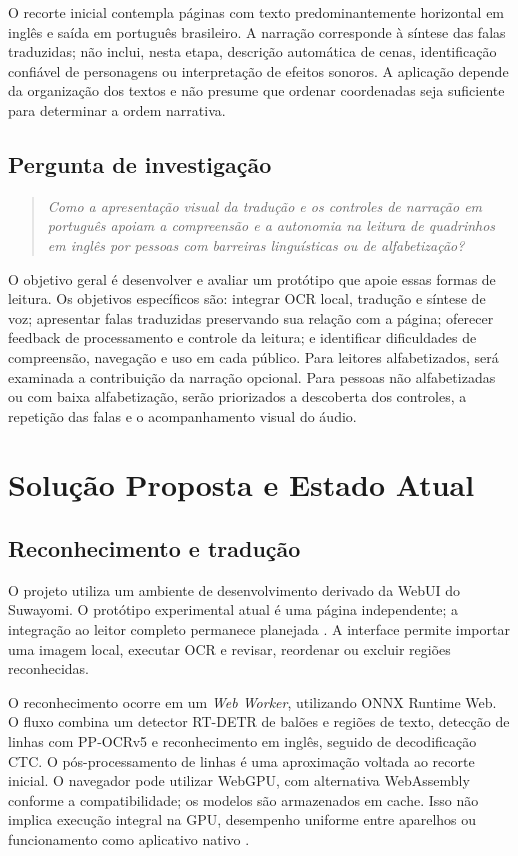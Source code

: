 \documentclass[conference]{IEEEtran}
\begin{document}
O recorte inicial contempla páginas com texto predominantemente horizontal em inglês e saída em português brasileiro. A narração corresponde à síntese das falas traduzidas; não inclui, nesta etapa, descrição automática de cenas, identificação confiável de personagens ou interpretação de efeitos sonoros. A aplicação depende da organização dos textos e não presume que ordenar coordenadas seja suficiente para determinar a ordem narrativa.

\subsection{Pergunta de investigação}
\begin{quote}
\emph{Como a apresentação visual da tradução e os controles de narração em português apoiam a compreensão e a autonomia na leitura de quadrinhos em inglês por pessoas com barreiras linguísticas ou de alfabetização?}
\end{quote}

O objetivo geral é desenvolver e avaliar um protótipo que apoie essas formas de leitura. Os objetivos específicos são: integrar OCR local, tradução e síntese de voz; apresentar falas traduzidas preservando sua relação com a página; oferecer feedback de processamento e controle da leitura; e identificar dificuldades de compreensão, navegação e uso em cada público. Para leitores alfabetizados, será examinada a contribuição da narração opcional. Para pessoas não alfabetizadas ou com baixa alfabetização, serão priorizados a descoberta dos controles, a repetição das falas e o acompanhamento visual do áudio.

\section{Solução Proposta e Estado Atual}
\subsection{Reconhecimento e tradução}
O projeto utiliza um ambiente de desenvolvimento derivado da WebUI do Suwayomi. O protótipo experimental atual é uma página independente; a integração ao leitor completo permanece planejada \cite{suwayomi}. A interface permite importar uma imagem local, executar OCR e revisar, reordenar ou excluir regiões reconhecidas.

O reconhecimento ocorre em um \emph{Web Worker}, utilizando ONNX Runtime Web. O fluxo combina um detector RT-DETR de balões e regiões de texto, detecção de linhas com PP-OCRv5 e reconhecimento em inglês, seguido de decodificação CTC. O pós-processamento de linhas é uma aproximação voltada ao recorte inicial. O navegador pode utilizar WebGPU, com alternativa WebAssembly conforme a compatibilidade; os modelos são armazenados em cache. Isso não implica execução integral na GPU, desempenho uniforme entre aparelhos ou funcionamento como aplicativo nativo \cite{onnxweb}.
\end{document}
